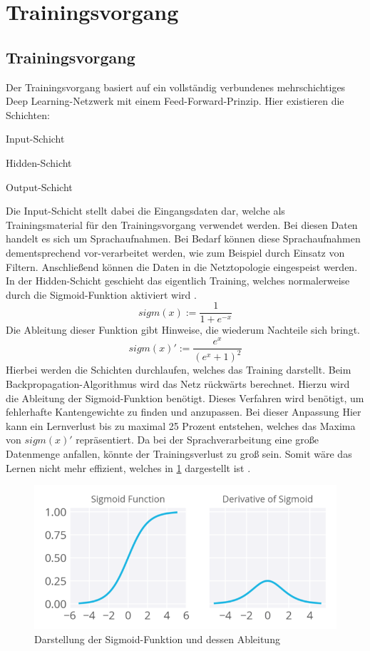 \section{Trainingsvorgang}

\subsection{Trainingsvorgang}
Der Trainingsvorgang basiert auf ein vollständig verbundenes mehrschichtiges Deep Learning-Netzwerk mit einem Feed-Forward-Prinzip. Hier existieren die Schichten:
\begin{description}
	\item Input-Schicht
	\item Hidden-Schicht 
	\item Output-Schicht
\end{description}
Die Input-Schicht stellt dabei die Eingangsdaten dar, welche als Trainingsmaterial für den Trainingsvorgang verwendet werden. Bei diesen Daten handelt es sich um Sprachaufnahmen. Bei Bedarf können diese Sprachaufnahmen dementsprechend vor-verarbeitet werden, wie zum Beispiel durch Einsatz von Filtern. Anschließend können die Daten in die Netztopologie eingespeist werden. In der Hidden-Schicht geschieht das eigentlich Training, welches normalerweise durch die Sigmoid-Funktion aktiviert wird \cite{bishop.2006}.
\begin{equation*}
sigm(x) :=\frac{ 1 }{1+e^{-x}  }
\label{normal}
\end{equation*}
Die Ableitung dieser Funktion gibt Hinweise, die wiederum Nachteile sich bringt. 
\begin{equation*}
sigm(x)':= \frac{ e^{x} }{(e^{x} +1)^2  }
\label{ableitung}
\end{equation*}
Hierbei werden die Schichten durchlaufen, welches das Training darstellt. 
Beim Backpropagation-Algorithmus wird das Netz rückwärts berechnet. Hierzu wird die Ableitung der Sigmoid-Funktion benötigt. Dieses Verfahren wird benötigt, um fehlerhafte Kantengewichte zu finden und anzupassen. Bei dieser Anpassung  Hier kann ein Lernverlust bis zu maximal 25 Prozent entstehen, welches das Maxima von $sigm(x)'$ repräsentiert. Da bei der Sprachverarbeitung eine große Datenmenge anfallen, könnte der Trainingsverlust zu groß sein.  Somit wäre das Lernen nicht mehr effizient, welches in \ref{fig:features11.0} dargestellt ist \cite{Kulbear.2017}.
\begin{figure}[h!]
	\centering
	\includegraphics[width=1.0\linewidth]{images/sigmund}
	\caption{Darstellung der Sigmoid-Funktion und dessen Ableitung \cite{Kulbear.2017}} %
	\label{fig:features11.0}
\end{figure}
